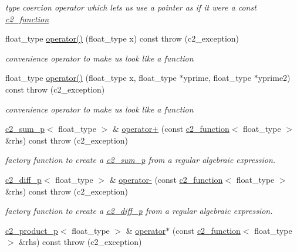 \begin{DoxyCompactItemize}
\begin{DoxyCompactList}\small\item\em type coercion operator which lets us use a pointer as if it were a const \hyperlink{classc2__function}{c2\-\_\-function} \end{DoxyCompactList}\item 
float\-\_\-type \hyperlink{classc2__const__ptr_a7c9a4582f4ddb5eee68a8ebbd14b4280}{operator()} (float\-\_\-type x) const   throw (c2\-\_\-exception)
\begin{DoxyCompactList}\small\item\em convenience operator to make us look like a function \end{DoxyCompactList}\item 
float\-\_\-type \hyperlink{classc2__const__ptr_accdc2e24cc09242d3ded1b7a22ae803e}{operator()} (float\-\_\-type x, float\-\_\-type $\ast$yprime, float\-\_\-type $\ast$yprime2) const   throw (c2\-\_\-exception)
\begin{DoxyCompactList}\small\item\em convenience operator to make us look like a function \end{DoxyCompactList}\item 
\hyperlink{classc2__sum__p}{c2\-\_\-sum\-\_\-p}$<$ float\-\_\-type $>$ \& \hyperlink{classc2__const__ptr_ad93bdeb0b0e78f31ce4fa4b83b38cf27}{operator+} (const \hyperlink{classc2__function}{c2\-\_\-function}$<$ float\-\_\-type $>$ \&rhs) const   throw (c2\-\_\-exception)
\begin{DoxyCompactList}\small\item\em factory function to create a \hyperlink{classc2__sum__p}{c2\-\_\-sum\-\_\-p} from a regular algebraic expression. \end{DoxyCompactList}\item 
\hyperlink{classc2__diff__p}{c2\-\_\-diff\-\_\-p}$<$ float\-\_\-type $>$ \& \hyperlink{classc2__const__ptr_ac2bc3992872343e2160040631ab43ffe}{operator-\/} (const \hyperlink{classc2__function}{c2\-\_\-function}$<$ float\-\_\-type $>$ \&rhs) const   throw (c2\-\_\-exception)
\begin{DoxyCompactList}\small\item\em factory function to create a \hyperlink{classc2__diff__p}{c2\-\_\-diff\-\_\-p} from a regular algebraic expression. \end{DoxyCompactList}\item 
\hyperlink{classc2__product__p}{c2\-\_\-product\-\_\-p}$<$ float\-\_\-type $>$ \& \hyperlink{classc2__const__ptr_a7be0220692df9d2118a14ee855d617be}{operator$\ast$} (const \hyperlink{classc2__function}{c2\-\_\-function}$<$ float\-\_\-type $>$ \&rhs) const   throw (c2\-\_\-exception)

\end{DoxyCompactItemize}
